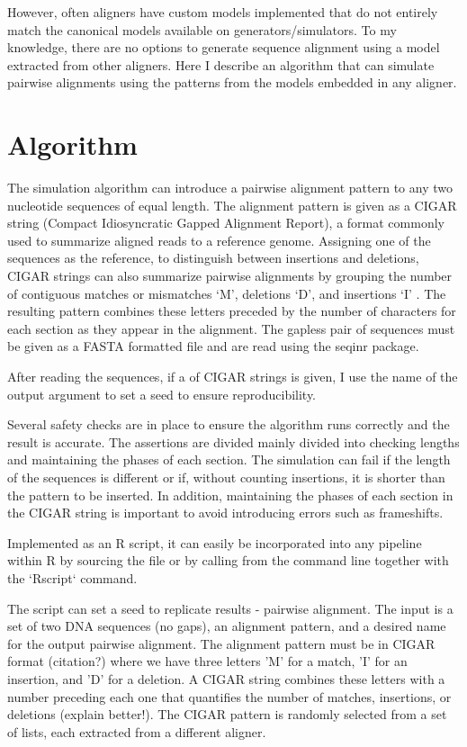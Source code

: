 However, often aligners have custom models implemented that do not entirely match the canonical models available on generators/simulators. To my knowledge, there are no options to generate sequence alignment using a model extracted from other aligners. Here I describe an algorithm that can simulate pairwise alignments using the patterns from the models embedded in any aligner.

\section{Algorithm}

The simulation algorithm can introduce a pairwise alignment pattern to any two nucleotide sequences of equal length. The alignment pattern is given as a CIGAR string (Compact Idiosyncratic Gapped Alignment Report), a format commonly used to summarize aligned reads to a reference genome. Assigning one of the sequences as the reference, to distinguish between insertions and deletions, CIGAR strings can also summarize pairwise alignments by grouping the number of contiguous matches or mismatches `M', deletions `D', and insertions `I' . The resulting pattern combines these letters preceded by the number of characters for each section as they appear in the alignment. The gapless pair of sequences must be given as a FASTA formatted file and are read using the seqinr \citep{seqinr} package.

After reading the sequences, if a  of CIGAR strings is given, I use the name of the output argument to set a seed to ensure reproducibility. 

Several safety checks are in place to ensure the algorithm runs correctly and the result is accurate. The assertions are divided mainly divided into checking lengths and maintaining the phases of each section.  The simulation can fail if the length of the sequences is different or if, without counting insertions, it is shorter than the pattern to be inserted. In addition, maintaining the phases of each section in the CIGAR string is important to avoid introducing errors such as frameshifts. 

Implemented as an R script, it can easily be incorporated into any pipeline within R by sourcing the file or by calling from the command line together with the `Rscript` command.

The script can set a seed to replicate results - pairwise alignment. The input is a set of two DNA sequences (no gaps), an alignment pattern, and a desired name for the output pairwise alignment. The alignment pattern must be in CIGAR format (citation?) where we have three letters 'M' for a match, 'I' for an insertion, and 'D' for a deletion. A CIGAR string combines these letters with a number preceding each one that quantifies the number of matches, insertions, or deletions (explain better!). The CIGAR pattern is randomly selected from a set of lists, each extracted from a different aligner.


